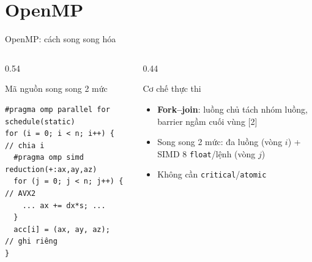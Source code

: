 \documentclass[aspectratio=169,11pt]{beamer}
\newcommand{\nguoi}{}
\newcommand{\nguoinoi}[1]{\renewcommand{\nguoi}{#1}}
\newcommand{\code}[1]{\texttt{\color{navy}#1}}
\begin{document}
\section{OpenMP}
\nguoinoi{Trình bày: Nguyễn Tùng Dương}

\begin{frame}[fragile]{OpenMP: cách song song hóa}
\begin{columns}[T]
\begin{column}{0.54\textwidth}
\begin{block}{Mã nguồn song song 2 mức}
\footnotesize
\begin{verbatim}
#pragma omp parallel for schedule(static)
for (i = 0; i < n; i++) {        // chia i
  #pragma omp simd reduction(+:ax,ay,az)
  for (j = 0; j < n; j++) {      // AVX2
    ... ax += dx*s; ...
  }
  acc[i] = (ax, ay, az);         // ghi riêng
}
\end{verbatim}
\end{block}
\end{column}
\begin{column}{0.44\textwidth}
\begin{block}{Cơ chế thực thi}
\small
\begin{itemize}
\setlength{\itemsep}{5pt}
\item \textbf{Fork--join}: luồng chủ tách nhóm luồng, barrier ngầm cuối vùng [2]
\item Song song 2 mức: \alert{đa luồng} (vòng $i$) + \alert{SIMD} 8 \code{float}/lệnh (vòng $j$)
\item Không cần \code{critical}/\code{atomic}
\end{itemize}
\end{block}
\end{column}
\end{columns}
\end{frame}
\end{document}
